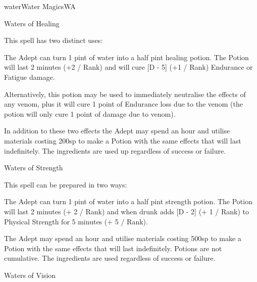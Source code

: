 \begin{college}[1.3]{water}{Water Magics}{WA}
\begin{spell}[S-11]{Waters of Healing}

\begin{effects}
This spell has two distinct uses:
\begin{Enumerate}
\item
The Adept can turn 1 pint of water into a half pint healing
potion. The Potion will last 2 minutes (+2 / Rank) and will cure [D -
5] (+1 / Rank) Endurance or Fatigue damage.

\item
Alternatively, this potion may be used to immediately neutralise the
effects of any venom, plus it will cure 1 point of Endurance loss due
to the venom (the potion will only cure 1 point of damage due to
venom).
\end{Enumerate}
In addition to these two effects the Adept may spend an hour and
utilise materials costing 200sp to make a Potion with the same effects
that will last indefinitely. The ingredients are used up regardless of
success or failure.
\end{effects}
\end{spell}

\begin{spell}[S-12]{Waters of Strength}

\begin{effects}
This spell can be prepared in two ways:
\begin{Enumerate}
\item
The Adept can turn 1 pint of water into a half pint strength
potion. The Potion will last 2 minutes (+ 2 / Rank) and when drunk
adds [D - 2] (+ 1 / Rank) to Physical Strength for 5 minutes (+ 5 /
Rank).

\item
The Adept may spend an hour and utilise materials costing 500sp to
make a Potion with the same effects that will last indefinitely.
Potions are not cumulative. The ingredients are used regardless of
success or failure.
\end{Enumerate}
\end{effects}
\end{spell}

\begin{spell}[S-13]{Waters of Vision}


\end{spell}
\end{college}
